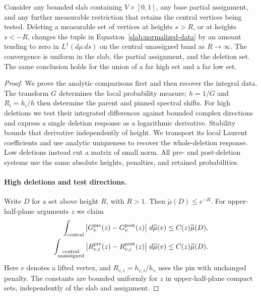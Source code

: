 \begin{lemma}
\label{lem:far-deletion}
Consider any bounded slab containing $V\times[0,1]$, any base partial
assignment, and any further measurable restriction that retains the
central vertices being tested. Deleting a measurable set of vertices
at heights $s>R$, or at heights $s<-R$, changes the tuple
in Equation~\eqref{slab:normalized-data} by an amount tending to zero
in $L^1(d\mu\,ds)$ on the central unassigned band as $R\to\infty$.
The convergence is uniform in the slab, the partial assignment, and
the deletion set. The same conclusion holds for the union of a far
high set and a far low set.
\end{lemma}

\begin{proof}
We prove the analytic comparisons first and then recover the integral
data. The transform $G$ determines the local probability measure;
$h=1/G$ and $R_i=h_i/h$ then determine the parent and pinned spectral
shifts. For high deletions we test their integrated differences against
bounded complex directions and express a single deletion response as
a logarithmic derivative. Stability bounds that derivative independently
of height. We transport its local Laurent coefficients and use analytic
uniqueness to recover the whole-deletion response. Low deletions instead
cut a matrix of small norm. All pre- and post-deletion systems use the same absolute
heights, penalties, and retained probabilities.

\paragraph{High deletions and test directions.}
Write $D$ for a set above height $R$, with $R>1$. Then
$\widetilde\mu(D)\leq e^{-R}$. For upper-half-plane arguments $z$ we
claim
\begin{align}
 \int_{\mathrm{central}}
 \left|G_v^{\mathrm{pre}}(z)-G_v^{\mathrm{post}}(z)\right|
 \,d\widetilde\mu(v)
 &\leq C(z)\widetilde\mu(D), \label{slab:high-G}\\
 \int_{\substack{\mathrm{central}\\\mathrm{unassigned}}}
 \left|R_{v,i}^{\mathrm{pre}}(z)-R_{v,i}^{\mathrm{post}}(z)\right|
 \,d\widetilde\mu(v)
 &\leq C(z)\widetilde\mu(D). \label{slab:high-R}
\end{align}
Here $v$ denotes a lifted vertex, and $R_{v,i}=h_{v,i}/h_v$ uses the
pin with unchanged penalty. The constants are bounded uniformly for
$z$ in upper-half-plane compact sets, independently of the slab and
assignment.


\end{proof}
